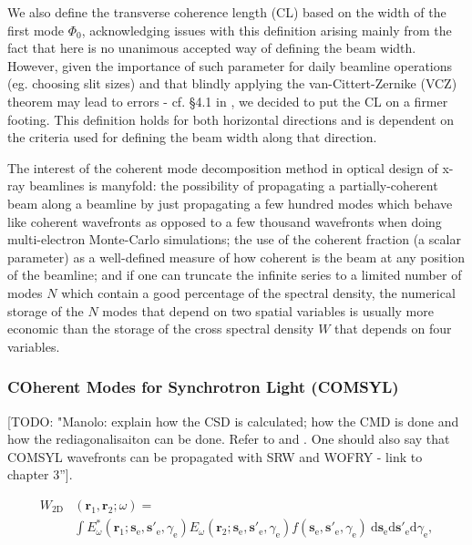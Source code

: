 \documentclass{iucr}              %
\newcommand{\todo}[1]{{\color{red}[TODO: "#1'']}}
\begin{document}
We also define the transverse coherence length (CL) based on the width of the first mode $\Phi_0$, acknowledging issues with this definition arising mainly from the fact that here is no unanimous accepted way of defining the beam width. However, given the importance of such parameter for daily beamline operations (eg. choosing slit sizes) and that blindly applying the van-Cittert-Zernike (VCZ) theorem may lead to errors - cf. §4.1 in \cite{geloni2008}, we decided to put the CL on a firmer footing. This definition holds for both horizontal directions and is dependent on the criteria used for defining the beam width along that direction. %

The interest of the coherent mode decomposition method in optical design of x-ray beamlines is manyfold: the possibility of propagating a partially-coherent beam along a beamline by just propagating a few hundred modes which behave like coherent wavefronts as opposed to a few thousand wavefronts when doing multi-electron Monte-Carlo simulations; the use of the coherent fraction (a scalar parameter) as a well-defined measure of how coherent is the beam at any position of the beamline; and if one can truncate the infinite series to a limited number of modes $N$ which contain a good percentage of the spectral density, the numerical storage of the $N$ modes that depend on two spatial variables is usually more economic than the storage of the cross spectral density $W$ that depends on four variables. 

\subsubsection{COherent Modes for Synchrotron Light (COMSYL)\\} 

\todo{Manolo: explain how the CSD is calculated; how the CMD is done and how the rediagonalisaiton can be done. Refer to \cite{codeCOMSYL} and \cite{glass2017}. One should also say that COMSYL wavefronts can be propagated with SRW and WOFRY - link to chapter 3}.

\begin{equation}
\begin{split}
    W_\text{2D}&(\textbf{r}_1,\textbf{r}_2;\omega) = \\
    &\int E_\omega^*(\textbf{r}_1;\textbf{s}_\text{e}, \textbf{s}'_\text{e}, \gamma_\text{e}) E_\omega(\textbf{r}_2;\textbf{s}_\text{e}, \textbf{s}'_\text{e}, \gamma_\text{e})f(\textbf{s}_\text{e}, \textbf{s}'_\text{e}, \gamma_\text{e})~ \text{d}\textbf{s}_\text{e} \text{d}\textbf{s}'_\text{e} \text{d}\gamma_\text{e},
\end{split}\label{eq:comsyl_CSD}
\end{equation}
\end{document}
